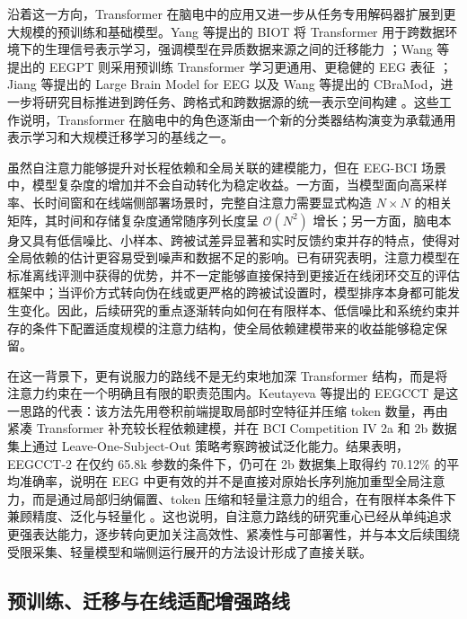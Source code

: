 沿着这一方向，Transformer 在脑电中的应用又进一步从任务专用解码器扩展到更大规模的预训练和基础模型。Yang 等提出的 BIOT 将 Transformer 用于跨数据环境下的生理信号表示学习，强调模型在异质数据来源之间的迁移能力 \cite{yang2023biot}；Wang 等提出的 EEGPT 则采用预训练 Transformer 学习更通用、更稳健的 EEG 表征 \cite{wang2024eegpt}；Jiang 等提出的 Large Brain Model for EEG 以及 Wang 等提出的 CBraMod，进一步将研究目标推进到跨任务、跨格式和跨数据源的统一表示空间构建 \cite{Jia24, Wan24b}。这些工作说明，Transformer 在脑电中的角色逐渐由一个新的分类器结构演变为承载通用表示学习和大规模迁移学习的基线之一。

虽然自注意力能够提升对长程依赖和全局关联的建模能力，但在 EEG-BCI 场景中，模型复杂度的增加并不会自动转化为稳定收益。一方面，当模型面向高采样率、长时间窗和在线端侧部署场景时，完整自注意力需要显式构造 $N\times N$ 的相关矩阵，其时间和存储复杂度通常随序列长度呈 $\mathcal{O}(N^2)$ 增长；另一方面，脑电本身又具有低信噪比、小样本、跨被试差异显著和实时反馈约束并存的特点，使得对全局依赖的估计更容易受到噪声和数据不足的影响。已有研究表明，注意力模型在标准离线评测中获得的优势，并不一定能够直接保持到更接近在线闭环交互的评估框架中；当评价方式转向伪在线或更严格的跨被试设置时，模型排序本身都可能发生变化\cite{songEEG2022, Car23}。因此，后续研究的重点逐渐转向如何在有限样本、低信噪比和系统约束并存的条件下配置适度规模的注意力结构，使全局依赖建模带来的收益能够稳定保留。

在这一背景下，更有说服力的路线不是无约束地加深 Transformer 结构，而是将注意力约束在一个明确且有限的职责范围内。Keutayeva 等提出的 EEGCCT 是这一思路的代表：该方法先用卷积前端提取局部时空特征并压缩 token 数量，再由紧凑 Transformer 补充较长程依赖建模，并在 BCI Competition IV 2a 和 2b 数据集上通过 Leave-One-Subject-Out 策略考察跨被试泛化能力。结果表明，EEGCCT-2 在仅约 65.8k 参数的条件下，仍可在 2b 数据集上取得约 70.12\% 的平均准确率，说明在 EEG 中更有效的并不是直接对原始长序列施加重型全局注意力，而是通过局部归纳偏置、token 压缩和轻量注意力的组合，在有限样本条件下兼顾精度、泛化与轻量化 \cite{keu2024compact}。这也说明，自注意力路线的研究重心已经从单纯追求更强表达能力，逐步转向更加关注高效性、紧凑性与可部署性，并与本文后续围绕受限采集、轻量模型和端侧运行展开的方法设计形成了直接关联。

\subsection{预训练、迁移与在线适配增强路线}

